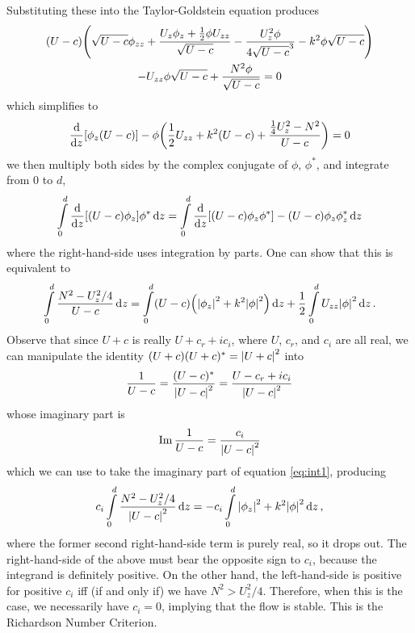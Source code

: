\documentclass[10pt]{article}
\newcommand{\lint}{\int\limits}
\begin{document}
Substituting these into the Taylor-Goldstein equation produces
\begin{multline}
    (U-c)\qty(\sqrt{U-c}\phi_{zz} + \frac{U_z\phi_z + \frac{1}{2}\phi U_{zz}}{\sqrt{U-c}} - \frac{U_z^2\phi}{4\sqrt{U-c}^3} - k^2\phi\sqrt{U-c}) \\ - U_{zz}\phi\sqrt{U-c} + \frac{N^2\phi}{\sqrt{U-c}} = 0
\end{multline}
which simplifies to
\begin{align}
    \dv{z}[\phi_z(U-c)] - \phi\qty(\frac{1}{2}U_{zz} + k^2(U-c) + \frac{\frac{1}{4}U_z^2-N^2}{U-c}) = 0
\end{align}
we then multiply both sides by the complex conjugate of $\phi$, $\phi^*$, and integrate from $0$ to $d$,
\begin{align}
    \lint_0^d\dv{z}[(U-c)\phi_z]\phi^*\dd{z} = \lint_0^d\dv{z}[(U-c)\phi_z\phi^*] - (U-c)\phi_z\phi^*_z\dd{z}
\end{align}
where the right-hand-side uses integration by parts. One can show that this is equivalent to
\begin{align}
    \lint_0^d\frac{N^2 - U_z^2/4}{U-c}\dd{z} = \lint_0^d(U-c)\qty(\abs{\phi_z}^2 + k^2\abs{\phi}^2)\dd{z} + \frac{1}{2}\lint_0^dU_{zz}\abs{\phi}^2\dd{z}. \label{eq:int1}
\end{align}
Observe that since $U+c$ is really $U + c_r + ic_i$, where $U$, $c_r$, and $c_i$ are all real, we can manipulate the identity $(U+c)(U+c)^* = \abs{U+c}^2$ into
\begin{align}
    \frac{1}{U-c} = \frac{(U-c)^*}{\abs{U-c}^2} = \frac{U-c_r+ic_i}{\abs{U-c}^2}
\end{align}
whose imaginary part is
\begin{align}
    \Im\frac{1}{U-c} = \frac{c_i}{\abs{U-c}^2}
\end{align}
which we can use to take the imaginary part of equation \eqref{eq:int1}, producing
\begin{align}
    c_i\lint_0^d\frac{N^2 - U_z^2/4}{\abs{U-c}^2}\dd{z} = -c_i\lint_0^d\abs{\phi_z}^2 + k^2\abs{\phi}^2\dd{z},
\end{align}
where the former second right-hand-side term is purely real, so it drops out. The right-hand-side of the above must bear the opposite sign to $c_i$, because the integrand is definitely positive. On the other hand, the left-hand-side is positive for positive $c_i$ iff (if and only if) we have $N^2 > U_z^2/4$. Therefore, when this is the case, we necessarily have $c_i = 0$, implying that the flow is stable. This is the Richardson Number Criterion.
\end{document}
